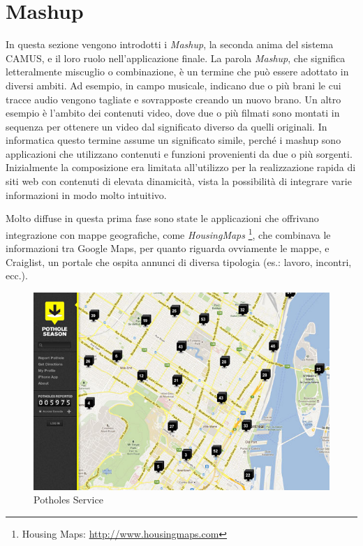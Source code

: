 \section{Mashup\label{sec:mashup}}

In questa sezione vengono introdotti i \emph{Mashup}, la seconda anima del sistema CAMUS, e il loro ruolo nell'applicazione finale.
La parola \emph{Mashup}, che significa letteralmente miscuglio o combinazione, è un termine che può essere adottato in diversi ambiti.
Ad esempio, in campo musicale, indicano due o più brani le cui tracce audio vengono tagliate e sovrapposte creando un nuovo brano. Un altro esempio è l'ambito dei contenuti video, dove due o più filmati sono montati in sequenza per ottenere un video dal significato diverso da quelli originali.
In informatica questo termine assume un significato simile, perché i mashup sono applicazioni che utilizzano contenuti e funzioni provenienti da due o più sorgenti\cite{DBLP:books/sp/DanielM14}.
Inizialmente la composizione era limitata all'utilizzo per la realizzazione rapida di siti web con contenuti di elevata dinamicità, vista la possibilità di integrare varie informazioni in modo molto intuitivo.

Molto diffuse in questa prima fase sono state le applicazioni che offrivano integrazione con mappe geografiche, come \emph{HousingMaps} \footnote{Housing Maps: \url{http://www.housingmaps.com}}, che combinava le informazioni tra Google Maps, per quanto riguarda ovviamente le mappe, e Craiglist, un portale che ospita annunci di diversa tipologia (es.: lavoro, incontri, ecc.).
\begin{figure}[ht]
	\centering
	\includegraphics[width=\textwidth]{2-nozioni-preliminari/Immagini/potholes_service.jpg}
	\caption{Potholes Service}\label{fig:potholes}
\end{figure}


